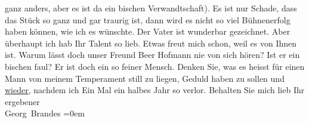 \begin{ledgroupsized}[t]{13cm}
               ganz anders, aber es ist da ein bischen Verwandtschaft).\pend
           \pstart
           Es ist nur Schade, dass das Stück so ganz und gar traurig ist, dann wird es nicht so viel Bühnenerfolg
               haben können, {\pb}wie ich es
               wünschte. Der Vater ist wunderbar gezeichnet. Aber überhaupt ich hab Ihr Talent so
               lieb. Etwas freut mich schon, weil es von Ihnen ist.\pend
           \pstart
           Warum lässt doch unser Freund Beer Hofmann nie
               von sich hören? Ist er ein bischen faul? Er ist doch ein so feiner Mensch.\pend
           \pstart
           Denken Sie, was es heisst für einen Mann von meinem Temperament still zu liegen,
               Geduld haben zu sollen und \uline{wieder}, nachdem ich Ein
               Mal ein halbes Jahr so verlor.\pend
           \pstart
           Behalten Sie mich lieb\pend
           \pstart
           Ihr ergebener{\\[\baselineskip]}\spacefill\mbox{Georg Brandes}\pend
           \leftskip=0em{}
         
         \endnumbering{}\end{ledgroupsized}  \newcommand{\dateiname}{L00876}\newcommand{\titel}{Georg Brandes an Arthur Schnitzler, 7. 1. 1899}\newcommand{\editorInnen}{Martin Anton Müller und Gerd-Hermann Susen}
      
